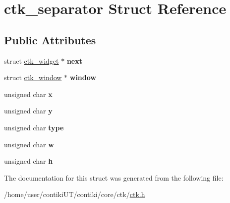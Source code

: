 \hypertarget{structctk__separator}{}\section{ctk\+\_\+separator Struct Reference}
\label{structctk__separator}
\subsection*{Public Attributes}
\begin{DoxyCompactItemize}
\item 
\hypertarget{structctk__separator_af1abdea68c9b89619d1d1ef991a9dd9f}{}struct \hyperlink{structctk__widget}{ctk\+\_\+widget} $\ast$ {\bfseries next}\label{structctk__separator_af1abdea68c9b89619d1d1ef991a9dd9f}

\item 
\hypertarget{structctk__separator_a3600a5e078dafd178de3c77643cf340f}{}struct \hyperlink{structctk__window}{ctk\+\_\+window} $\ast$ {\bfseries window}\label{structctk__separator_a3600a5e078dafd178de3c77643cf340f}

\item 
\hypertarget{structctk__separator_afd380c20c38a51cb7f62d11d10c326c5}{}unsigned char {\bfseries x}\label{structctk__separator_afd380c20c38a51cb7f62d11d10c326c5}

\item 
\hypertarget{structctk__separator_a2acbb6e1b6b78c704c122b22b5fe6aff}{}unsigned char {\bfseries y}\label{structctk__separator_a2acbb6e1b6b78c704c122b22b5fe6aff}

\item 
\hypertarget{structctk__separator_a71677298a55101a546d319069b8ae9ab}{}unsigned char {\bfseries type}\label{structctk__separator_a71677298a55101a546d319069b8ae9ab}

\item 
\hypertarget{structctk__separator_a184d270373f640c32e5b0d7e5ea4779b}{}unsigned char {\bfseries w}\label{structctk__separator_a184d270373f640c32e5b0d7e5ea4779b}

\item 
\hypertarget{structctk__separator_a4f6dbb1e907fc4f71e54c3d14182479f}{}unsigned char {\bfseries h}\label{structctk__separator_a4f6dbb1e907fc4f71e54c3d14182479f}

\end{DoxyCompactItemize}


The documentation for this struct was generated from the following file\+:\begin{DoxyCompactItemize}
\item 
/home/user/contiki\+U\+T/contiki/core/ctk/\hyperlink{ctk_8h}{ctk.\+h}\end{DoxyCompactItemize}
